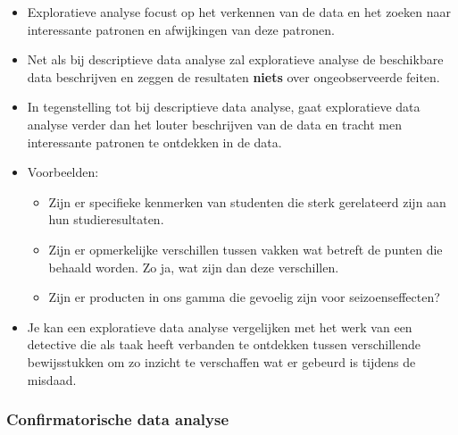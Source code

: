 \documentclass[]{tufte-book}
\providecommand{\tightlist}{%
  \setlength{\itemsep}{0pt}\setlength{\parskip}{0pt}}
\begin{document}
\begin{itemize}
\tightlist
\item
  Exploratieve analyse focust op het verkennen van de data en het zoeken naar interessante patronen en afwijkingen van deze patronen.
\item
  Net als bij descriptieve data analyse zal exploratieve analyse de beschikbare data beschrijven en zeggen de resultaten \textbf{niets} over ongeobserveerde feiten.
\item
  In tegenstelling tot bij descriptieve data analyse, gaat exploratieve data analyse verder dan het louter beschrijven van de data en tracht men interessante patronen te ontdekken in de data.
\item
  Voorbeelden:

  \begin{itemize}
  \tightlist
  \item
    Zijn er specifieke kenmerken van studenten die sterk gerelateerd zijn aan hun studieresultaten.
  \item
    Zijn er opmerkelijke verschillen tussen vakken wat betreft de punten die behaald worden. Zo ja, wat zijn dan deze verschillen.
  \item
    Zijn er producten in ons gamma die gevoelig zijn voor seizoenseffecten?
  \end{itemize}
\item
  Je kan een exploratieve data analyse vergelijken met het werk van een detective die als taak heeft verbanden te ontdekken tussen verschillende bewijsstukken om zo inzicht te verschaffen wat er gebeurd is tijdens de misdaad.
\end{itemize}

\hypertarget{confirmatorische-data-analyse}{%
\subsubsection*{Confirmatorische data analyse}\label{confirmatorische-data-analyse}}
\end{document}
